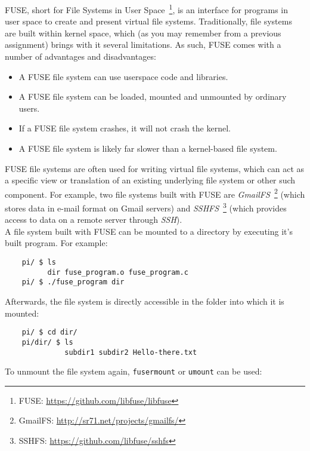 \documentclass [a4,twoside,11pt] {article}
\begin{document}
    FUSE, short for File Systems in User Space~\footnote{FUSE: \url{https://github.com/libfuse/libfuse}}, is an interface for programs in user space to create and present virtual file systems. Traditionally, file systems are built within kernel space, which (as you may remember from a previous assignment) brings with it several limitations. As such, FUSE comes with a number of advantages and disadvantages:

    \begin{itemize}
        \itemsep1pt\parskip0pt
        \item A FUSE file system can use userspace code and libraries.
        \item A FUSE file system can be loaded, mounted and unmounted by ordinary users.
        \item If a FUSE file system crashes, it will not crash the kernel.
        \item A FUSE file system is likely far slower than a kernel-based file system.
    \end{itemize}

    FUSE file systems are often used for writing virtual file systems, which can act as a specific view or translation of an existing underlying file system or other such component. For example, two file systems built with FUSE are \textit{GmailFS}~\footnote{GmailFS: \url{http://sr71.net/projects/gmailfs/}} (which stores data in e-mail format on Gmail servers) and \textit{SSHFS}~\footnote{SSHFS: \url{https://github.com/libfuse/sshfs}} (which provides access to data on a remote server through \textit{SSH}).\\

    A file system built with FUSE can be mounted to a directory by executing it's built program. For example:

    \begin{verbatim}
    pi/ $ ls
          dir fuse_program.o fuse_program.c
    pi/ $ ./fuse_program dir\end{verbatim}
    
    Afterwards, the file system is directly accessible in the folder into which it is mounted:

    \begin{verbatim}
    pi/ $ cd dir/
    pi/dir/ $ ls
              subdir1 subdir2 Hello-there.txt\end{verbatim}
    
    To unmount the file system again, \texttt{fusermount} or \texttt{umount} can be used:
\end{document}

